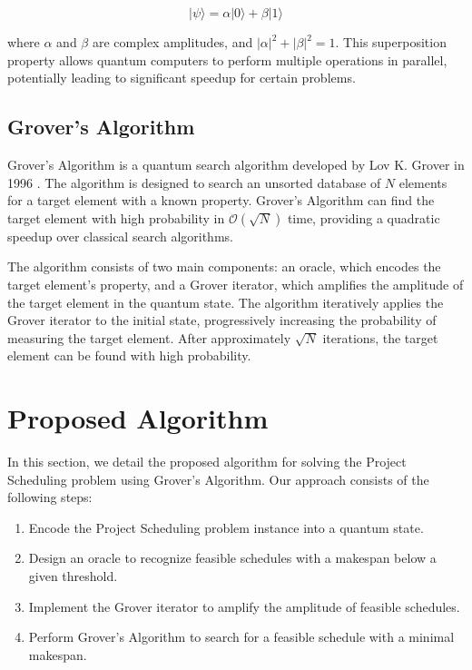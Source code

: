 \[ |\psi\rangle = \alpha |0\rangle + \beta |1\rangle \]

where $\alpha$ and $\beta$ are complex amplitudes, and $|\alpha|^2 + |\beta|^2 = 1$. This superposition property allows quantum computers to perform multiple operations in parallel, potentially leading to significant speedup for certain problems.

\subsection{Grover's Algorithm}

Grover's Algorithm is a quantum search algorithm developed by Lov K. Grover in 1996 \cite{grover1996fast}. The algorithm is designed to search an unsorted database of $N$ elements for a target element with a known property. Grover's Algorithm can find the target element with high probability in $\mathcal{O}(\sqrt{N})$ time, providing a quadratic speedup over classical search algorithms.

The algorithm consists of two main components: an oracle, which encodes the target element's property, and a Grover iterator, which amplifies the amplitude of the target element in the quantum state. The algorithm iteratively applies the Grover iterator to the initial state, progressively increasing the probability of measuring the target element. After approximately $\sqrt{N}$ iterations, the target element can be found with high probability.

\section{Proposed Algorithm} \label{sec:algorithm}

In this section, we detail the proposed algorithm for solving the Project Scheduling problem using Grover's Algorithm. Our approach consists of the following steps:

\begin{enumerate}
    \item Encode the Project Scheduling problem instance into a quantum state.
    \item Design an oracle to recognize feasible schedules with a makespan below a given threshold.
    \item Implement the Grover iterator to amplify the amplitude of feasible schedules.
    \item Perform Grover's Algorithm to search for a feasible schedule with a minimal makespan.
\end{enumerate}

